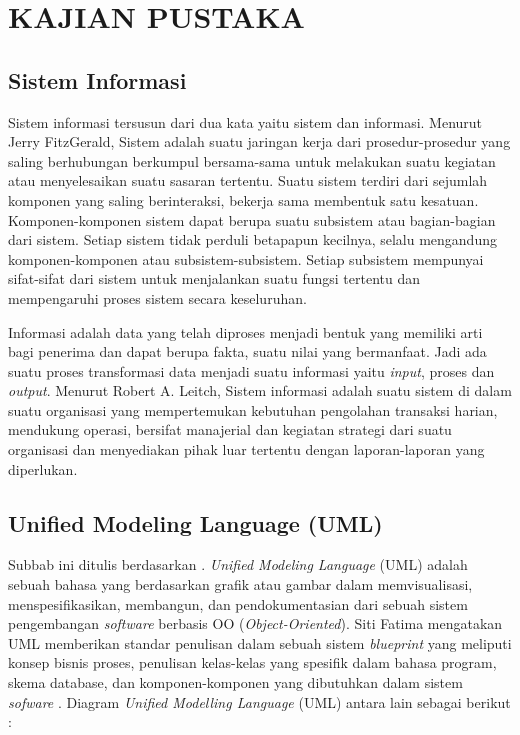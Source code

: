 
\chapter{KAJIAN PUSTAKA}

\section{Sistem Informasi}

Sistem informasi tersusun dari dua kata yaitu sistem dan informasi. Menurut Jerry FitzGerald, Sistem adalah suatu jaringan kerja dari prosedur-prosedur yang saling berhubungan berkumpul bersama-sama untuk melakukan suatu kegiatan atau menyelesaikan suatu sasaran tertentu. Suatu sistem terdiri dari sejumlah komponen yang saling berinteraksi, bekerja sama membentuk satu kesatuan. Komponen-komponen sistem dapat berupa suatu subsistem atau bagian-bagian dari sistem. Setiap sistem tidak perduli betapapun kecilnya, selalu mengandung komponen-komponen atau subsistem-subsistem. Setiap subsistem mempunyai sifat-sifat dari sistem untuk menjalankan suatu fungsi tertentu dan mempengaruhi proses sistem secara keseluruhan. \citep{FitzGerald1981Fundamental:14}

Informasi adalah data yang telah diproses menjadi bentuk yang memiliki arti bagi penerima dan dapat berupa fakta, suatu nilai yang bermanfaat. Jadi ada suatu proses transformasi data menjadi suatu informasi yaitu \emph{input}, proses dan \emph{output}. Menurut Robert A. Leitch, Sistem informasi adalah suatu sistem di dalam suatu organisasi yang mempertemukan kebutuhan pengolahan transaksi harian, mendukung operasi, bersifat manajerial dan kegiatan strategi dari suatu organisasi dan menyediakan pihak luar tertentu dengan laporan-laporan yang diperlukan. \citep{Robert2001Sistem:15}      

\section{Unified Modeling Language (UML)}

Subbab ini ditulis berdasarkan \citep{Suendri2019metode:13}. \emph{Unified Modeling Language} (UML) adalah sebuah bahasa yang berdasarkan grafik atau gambar dalam memvisualisasi, menspesifikasikan, membangun, dan pendokumentasian dari sebuah sistem pengembangan \emph{software} berbasis OO (\emph{Object-Oriented}). Siti Fatima mengatakan UML memberikan standar penulisan dalam sebuah sistem \emph{blueprint} yang meliputi konsep bisnis proses, penulisan kelas-kelas yang spesifik dalam bahasa program, skema database, dan komponen-komponen yang dibutuhkan dalam sistem \emph{sofware} \cite{Fatima2013Perangcangan:14}. 
Diagram \emph{Unified Modelling Language} (UML) antara lain sebagai berikut :

